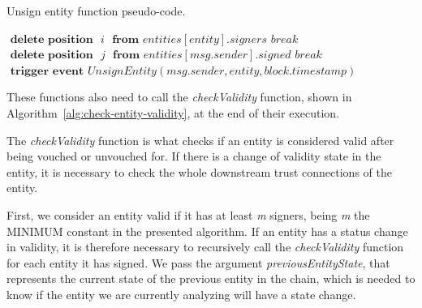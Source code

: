 \begin{algorithm}
  \caption{Unsign entity function pseudo-code.}
  \label{alg:unsign-entity}
  \begin{algorithmic}[1]
          \State $\textbf{ delete position } \textit{ i } \textbf{ from } entities[entity].signers$
          \State $break$
        \EndIf
      \EndFor
      \State
          \State $\textbf{ delete position } \textit{ j }\textbf{ from } entities[msg.sender].signed$
          \State $break$
        \EndIf
      \EndFor
      \State
      \State $\textbf{ trigger event } UnsignEntity(msg.sender, entity, block.timestamp)$
      \State
      \State {}
    \EndFunction
  \end{algorithmic}
\end{algorithm}

These functions also need to call the \textit{checkValidity} function, shown in Algorithm~\ref{alg:check-entity-validity}, at the end of their execution.

The \textit{checkValidity} function is what checks if an entity is considered valid after being vouched or unvouched for.
If there is a change of validity state in the entity, it is necessary to check the whole downstream trust connections of the entity.

First, we consider an entity valid if it has at least \textit{m} signers, being \textit{m} the MINIMUM constant in the presented algorithm.
If an entity has a status change in validity, it is therefore necessary to recursively call the \textit{checkValidity} function for each entity it has signed.
We pass the argument \textit{previousEntityState}, that represents the current state of the previous entity in the chain, which is needed to know if the entity we are currently analyzing will have a state change.

